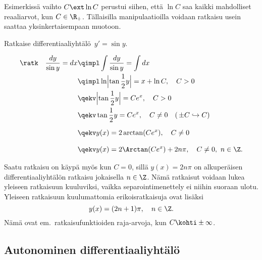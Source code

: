 Esimerkissä vaihto $C\ext\ln C$ perustui siihen, että $\ln C$ saa kaikki mahdolliset
reaaliarvot, kun $C\in\R_+$. Tällaisilla manipulaatioilla voidaan ratkaisu usein saattaa
yksinkertaisempaan muotoon.
\begin{Exa} \label{muuan separoituva dy}
Ratkaise differentiaaliyhtälö $\,y'=\sin y$.
\end{Exa}
\begin{align*}
\text{\ratk}\quad \frac{dy}{\sin y} = dx 
                       &\qimpl \int\frac{dy}{\sin y} = \int dx \\
                       &\qimpl \ln\Bigl|\tan\frac{1}{2}y\Bigr| = x +\ln C,\quad C>0 \\
                       &\qekv \Bigl|\tan\frac{1}{2}y\Bigr| = Ce^x,\quad C>0 \\
                       &\qekv \tan\frac{1}{2} y = Ce^x,\quad C\neq 0 \quad 
                                                       (\,\pm C \hookrightarrow C) \\[2mm]
                       &\qekv y(x) = 2\arctan(Ce^x), \quad C \neq 0 \\[3mm]
                       &\qekv y(x) = 2\Arctan(Ce^x)+2n\pi, \quad C \neq 0,\ n\in\Z.
\end{align*}

Saatu ratkaisu on käypä myös kun $C=0$, sillä $y(x)=2n\pi$ on alkuperäisen
differentiaaliyhtälön ratkaisu jokaisella $n\in\Z$. Nämä ratkaisut voidaan lukea yleiseen
ratkaisuun kuuluviksi, vaikka separointimenettely ei niihin suoraan ulotu. Yleiseen ratkaisuun
kuulumattomia erikoisratkaisuja ovat lisäksi
\[
y(x)=(2n+1)\pi, \quad n\in\Z.
\]
Nämä ovat em.\ ratkaisufunktioiden raja-arvoja, kun $C\kohti\pm\infty$.
\loppu

\subsection{Autonominen differentiaaliyhtälö}


